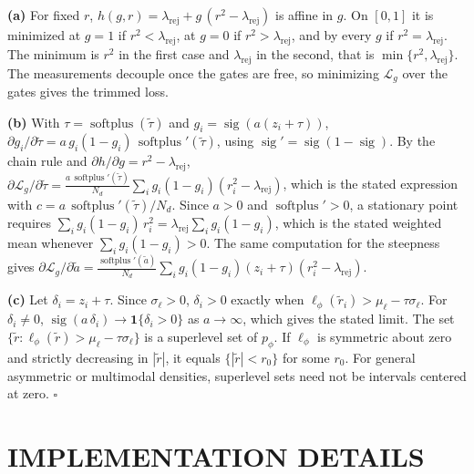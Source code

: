 \documentclass[twoside]{article}
\newcommand{\rej}{\lambda_{\mathrm{rej}}}
\DeclareMathOperator{\sig}{sig}
\DeclareMathOperator{\softplus}{softplus}
\begin{document}
\textbf{(a)} For fixed $r$, $h(g, r) = \rej + g\,(r^2 - \rej)$ is affine in $g$.
On $[0,1]$ it is minimized at $g = 1$ if $r^2 < \rej$, at $g = 0$ if
$r^2 > \rej$, and by every $g$ if $r^2 = \rej$. The minimum is $r^2$ in the first
case and $\rej$ in the second, that is $\min\{r^2, \rej\}$. The measurements
decouple once the gates are free, so minimizing $\mathcal{L}_g$ over the gates
gives the trimmed loss.

\textbf{(b)} With $\tau = \softplus(\tilde\tau)$ and $g_i = \sig(a(z_i+\tau))$,
$\partial g_i/\partial\tilde\tau = a\, g_i(1-g_i)\,\softplus'(\tilde\tau)$, using
$\sig' = \sig(1-\sig)$. By the chain rule and $\partial h/\partial g = r^2 - \rej$,
$\partial\mathcal{L}_g/\partial\tilde\tau =
\frac{a\,\softplus'(\tilde\tau)}{N_d}\sum_i g_i(1-g_i)(r_i^2 - \rej)$, which is the
stated expression with $c = a\,\softplus'(\tilde\tau)/N_d$. Since
$a > 0$ and $\softplus' > 0$, a stationary point requires
$\sum_i g_i(1-g_i)\, r_i^2 = \rej \sum_i g_i(1-g_i)$, which is the stated
weighted mean whenever $\sum_i g_i(1-g_i) > 0$. The same computation for the
steepness gives $\partial\mathcal{L}_g/\partial\tilde a =
\frac{\softplus'(\tilde a)}{N_d}\sum_i g_i(1-g_i)(z_i + \tau)(r_i^2 - \rej)$.

\textbf{(c)} Let $\delta_i = z_i + \tau$. Since $\sigma_\ell > 0$,
$\delta_i > 0$ exactly when $\ell_\phi(\tilde r_i) > \mu_\ell - \tau\sigma_\ell$.
For $\delta_i \neq 0$, $\sig(a\,\delta_i) \to \mathbf{1}\{\delta_i > 0\}$ as
$a \to \infty$, which gives the stated limit. The set
$\{\tilde r : \ell_\phi(\tilde r) > \mu_\ell - \tau\sigma_\ell\}$ is
a superlevel set of $p_\phi$. If $\ell_\phi$ is symmetric about zero and strictly
decreasing in $|\tilde r|$, it equals $\{|\tilde r| < r_0\}$ for some $r_0$.
For general asymmetric or multimodal densities, superlevel sets need not be
intervals centered at zero.
\hfill$\square$

\section{IMPLEMENTATION DETAILS}
\label{app:method}
\end{document}
